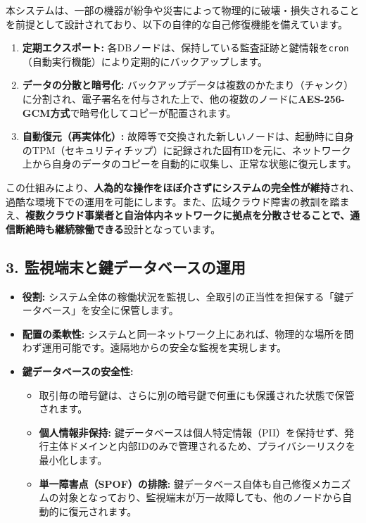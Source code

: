 \documentclass[
  a4paper,
  ja=standard,
  xelatex]{bxjsarticle}
\begin{document}
本システムは、一部の機器が紛争や災害によって物理的に破壊・損失されることを前提として設計されており、以下の自律的な自己修復機能を備えています。

\begin{enumerate}
\def\labelenumi{\arabic{enumi}.}
\item
  \textbf{定期エクスポート:}
  各DBノードは、保持している監査証跡と鍵情報を\texttt{cron}（自動実行機能）により定期的にバックアップします。
\item
  \textbf{データの分散と暗号化:}
  バックアップデータは複数のかたまり（チャンク）に分割され、電子署名を付与された上で、他の複数のノードに\textbf{AES-256-GCM方式}で暗号化してコピーが配置されます。
\item
  \textbf{自動復元（再実体化）:}
  故障等で交換された新しいノードは、起動時に自身のTPM（セキュリティチップ）に記録された固有IDを元に、ネットワーク上から自身のデータのコピーを自動的に収集し、正常な状態に復元します。
\end{enumerate}

この仕組みにより、\textbf{人為的な操作をほぼ介さずにシステムの完全性が維持}され、過酷な環境下での運用を可能にします。また、広域クラウド障害の教訓を踏まえ、\textbf{複数クラウド事業者と自治体内ネットワークに拠点を分散させることで、通信断絶時も継続稼働できる}設計となっています。

\subsection{\texorpdfstring{\textbf{3.
監視端末と鍵データベースの運用}}{3. 監視端末と鍵データベースの運用}}\label{ux76e3ux8996ux7aefux672bux3068ux9375ux30c7ux30fcux30bfux30d9ux30fcux30b9ux306eux904bux7528}

\begin{itemize}
\item
  \textbf{役割:}
  システム全体の稼働状況を監視し、全取引の正当性を担保する「鍵データベース」を安全に保管します。
\item
  \textbf{配置の柔軟性:}
  システムと同一ネットワーク上にあれば、物理的な場所を問わず運用可能です。遠隔地からの安全な監視を実現します。
\item
  \textbf{鍵データベースの安全性:}

  \begin{itemize}
  \item
    取引毎の暗号鍵は、さらに別の暗号鍵で何重にも保護された状態で保管されます。
  \item
    \textbf{個人情報非保持:}
    鍵データベースは個人特定情報（PII）を保持せず、発行主体ドメインと内部IDのみで管理されるため、プライバシーリスクを最小化します。
  \item
    \textbf{単一障害点（SPOF）の排除:}
    鍵データベース自体も自己修復メカニズムの対象となっており、監視端末が万一故障しても、他のノードから自動的に復元されます。
  \end{itemize}
\end{itemize}
\end{document}
